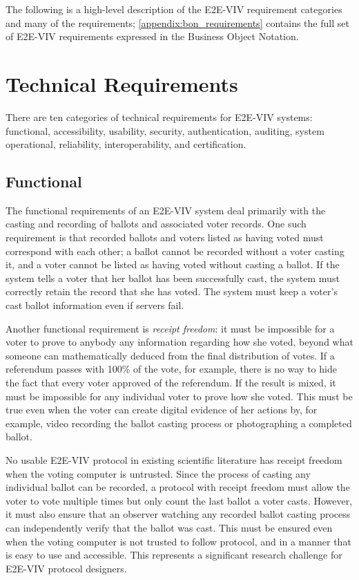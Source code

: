 The following is a high-level description of the E2E-VIV requirement
categories and many of the requirements;
\autoref{appendix:bon_requirements} contains the full set of E2E-VIV
requirements expressed in the Business Object Notation.

\section{Technical Requirements}
There are ten categories of technical requirements for E2E-VIV
systems: functional, accessibility, usability, security,
authentication, auditing, system operational, reliability,
interoperability, and certification. 

\subsection{Functional} 
\label{sec:functional}

The functional requirements of an E2E-VIV system deal primarily with
the casting and recording of ballots and associated voter records. One
such requirement is that recorded ballots and voters listed as having
voted must correspond with each other; a ballot cannot be recorded
without a voter casting it, and a voter cannot be listed as having
voted without casting a ballot. If the system tells a voter that her
ballot has been successfully cast, the system must correctly retain
the record that she has voted. The system must keep a voter's cast
ballot information even if servers fail.

Another functional requirement is \emph{receipt freedom}: it must be
impossible for a voter to prove to anybody any information regarding
how she voted, beyond what someone can mathematically deduced from the
final distribution of votes. If a referendum passes with 100\% of the
vote, for example, there is no way to hide the fact that every voter
approved of the referendum. If the result is mixed, it must be
impossible for any individual voter to prove how she voted.  This must
be true even when the voter can create digital evidence of her actions
by, for example, video recording the ballot casting process or
photographing a completed ballot. 

No usable E2E-VIV protocol in existing scientific literature has
receipt freedom when the voting computer is untrusted. Since the
process of casting any individual ballot can be recorded, a protocol
with receipt freedom must allow the voter to vote multiple times but
only count the last ballot a voter casts. However, it must also ensure
that an observer watching any recorded ballot casting process can
independently verify that the ballot was cast. This must be ensured
even when the voting computer is not trusted to follow protocol, and
in a manner that is easy to use and accessible. This represents a
significant research challenge for E2E-VIV protocol designers.

